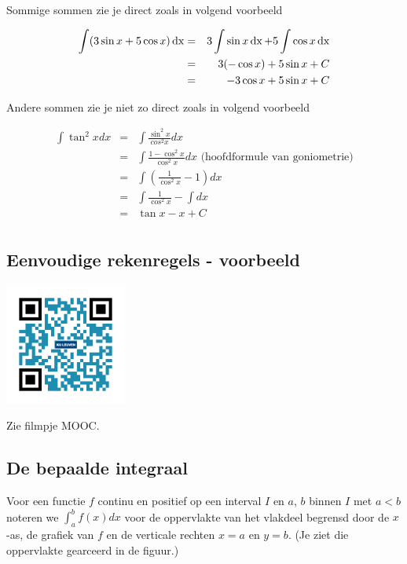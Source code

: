 Sommige sommen zie je direct zoals in volgend voorbeeld

\begin{voorbeeld} 
	\begin{eqnarray*}
	\int (3 \sin x + 5 \cos x) \operatorname{dx} &=& 3 \int \sin x \operatorname{dx} + 5 \int \cos x \operatorname{dx} \\
	&=& 3 (-\cos x ) + 5 \sin x +C \\
	&=& -3 \cos x + 5 \sin x + C
	\end{eqnarray*}
\end{voorbeeld}

Andere sommen zie je niet zo direct zoals in volgend voorbeeld

\begin{voorbeeld}
	\begin{eqnarray*}
	\int \tan ^2 x dx
	&=&\int \frac{\sin^2 x}{cos ^2 x}dx\\
	&=& \int \frac{1-\cos^2 x}{\cos ^2 x} dx \text { (hoofdformule van goniometrie)}\\
	&=& \int \left( \frac{1}{\cos^2 x} -1 \right)dx\\
	&=& \int \frac{1}{\cos ^2 x} - \int dx\\
	&=& \tan x -x +C\\
	\end{eqnarray*}
\end{voorbeeld}

\subsection{Eenvoudige rekenregels - voorbeeld}
\begin{minipage}{.25\linewidth}
	\raggedright
	\includegraphics[width=4cm]{6_afgeleiden_integralen/inputs/QR_Code_EENVRRVB_module6_2}
\end{minipage}
\begin{minipage}{.7\linewidth}
	Zie filmpje MOOC.
\end{minipage}

\subsection{De bepaalde integraal}
Voor een functie $f$ continu en positief op een interval $I$ en $a$, $b$ binnen $I$ met $a<b$ noteren we $\int^b_a f(x)dx$ voor de oppervlakte van het vlakdeel begrensd door de $x$-as, de grafiek van $f$ en de verticale rechten $x=a$ en $y=b$.
(Je ziet die oppervlakte gearceerd in de figuur.)

